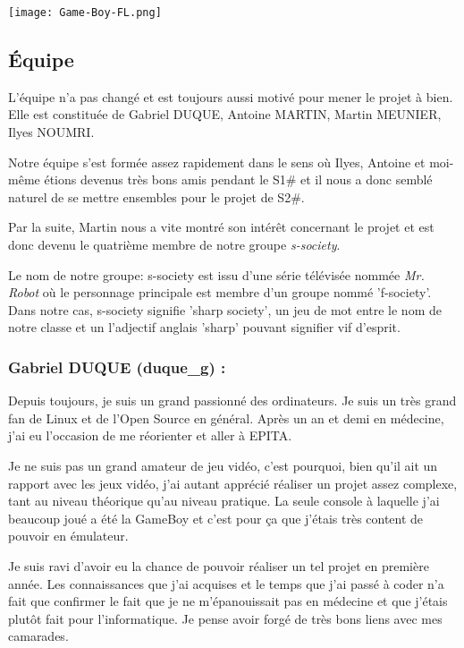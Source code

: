 \documentclass[12pt, a4paper]{article}
\begin{document}
\begin{center}
\texttt{[image: Game-Boy-FL.png]}
\end{center}

\pagebreak
\subsection{Équipe}
L'équipe n'a pas changé et est toujours aussi motivé pour mener le projet à bien. Elle est constituée de Gabriel DUQUE, Antoine MARTIN, Martin MEUNIER, Ilyes NOUMRI.
\bigskip

Notre équipe s'est formée assez rapidement dans le sens où Ilyes, Antoine et moi-même étions devenus très bons amis pendant le S1\# et il nous a donc semblé naturel de se mettre ensembles pour le projet de S2\#.
\bigskip

Par la suite, Martin nous a vite montré son intérêt concernant le projet et est donc devenu le quatrième membre de notre groupe \textit{s-society}.

\bigskip
Le nom de notre groupe: s-society est issu d'une série télévisée nommée \textit{Mr. Robot} où le personnage principale est membre d'un groupe nommé 'f-society'. Dans notre cas, s-society signifie 'sharp society', un jeu de mot entre le nom de notre classe et un l'adjectif anglais 'sharp' pouvant signifier vif d'esprit.
\pagebreak

\subsubsection{Gabriel DUQUE (duque\_g) :}
Depuis toujours, je suis un grand passionné des ordinateurs. Je suis un très grand fan de Linux et de l'Open Source en général. Après un an et demi en médecine, j'ai eu l'occasion de me réorienter et aller à EPITA. 
\bigskip

Je ne suis pas un grand amateur de jeu vidéo, c'est pourquoi, bien qu'il ait un rapport avec les jeux vidéo, j'ai autant apprécié réaliser un projet assez complexe, tant au niveau théorique qu'au niveau pratique. La seule console à laquelle j'ai beaucoup joué a été la GameBoy et c'est pour ça que j'étais très content de pouvoir en émulateur.
\bigskip

Je suis ravi d'avoir eu la chance de pouvoir réaliser un tel projet en première année. Les connaissances que j'ai acquises et le temps que j'ai passé à coder n'a fait que confirmer le fait que je ne m'épanouissait pas en médecine et que j'étais plutôt fait pour l'informatique. Je pense avoir forgé de très bons liens avec mes camarades.
\bigskip
\end{document}
